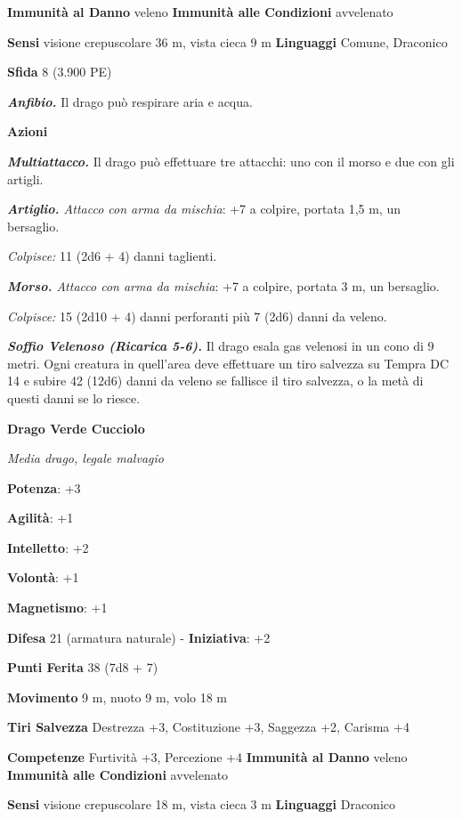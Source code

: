 \begin{multicols}{2}
\textbf{Immunità al Danno} veleno \textbf{Immunità alle Condizioni}
avvelenato

\textbf{Sensi} visione crepuscolare 36 m, vista cieca 9 m
\textbf{Linguaggi} Comune, Draconico

\textbf{Sfida} 8 (3.900 PE)

\emph{\textbf{Anfibio.}} Il drago può respirare aria e acqua.

\textbf{Azioni}

\emph{\textbf{Multiattacco.}} Il drago può effettuare tre attacchi: uno
con il morso e due con gli artigli.

\emph{\textbf{Artiglio.} Attacco con arma da mischia}: +7 a colpire,
portata 1,5 m, un bersaglio.

\emph{Colpisce:} 11 (2d6 + 4) danni taglienti.

\emph{\textbf{Morso.} Attacco con arma da mischia}: +7 a colpire,
portata 3 m, un bersaglio.

\emph{Colpisce:} 15 (2d10 + 4) danni perforanti più 7 (2d6) danni da
veleno.

\emph{\textbf{Soffio Velenoso (Ricarica 5-6).}} Il drago esala gas
velenosi in un cono di 9 metri. Ogni creatura in quell'area deve
effettuare un tiro salvezza su Tempra DC 14 e subire 42 (12d6)
danni da veleno se fallisce il tiro salvezza, o la metà di questi danni
se lo riesce.



\textbf{Drago Verde Cucciolo}

\emph{Media drago, legale malvagio}

\textbf{Potenza}: +3

\textbf{Agilità}: +1

\textbf{Intelletto}: +2

\textbf{Volontà}: +1

\textbf{Magnetismo}: +1

\textbf{Difesa} 21 (armatura naturale) - \textbf{Iniziativa}: +2

\textbf{Punti Ferita} 38 (7d8 + 7)

\textbf{Movimento} 9 m, nuoto 9 m, volo 18 m

\textbf{Tiri Salvezza} Destrezza +3, Costituzione +3, Saggezza +2,
Carisma +4

\textbf{Competenze} Furtività +3, Percezione +4 \textbf{Immunità al Danno}
veleno \textbf{Immunità alle Condizioni} avvelenato

\textbf{Sensi} visione crepuscolare 18 m, vista cieca 3 m
\textbf{Linguaggi} Draconico


\end{multicols}
